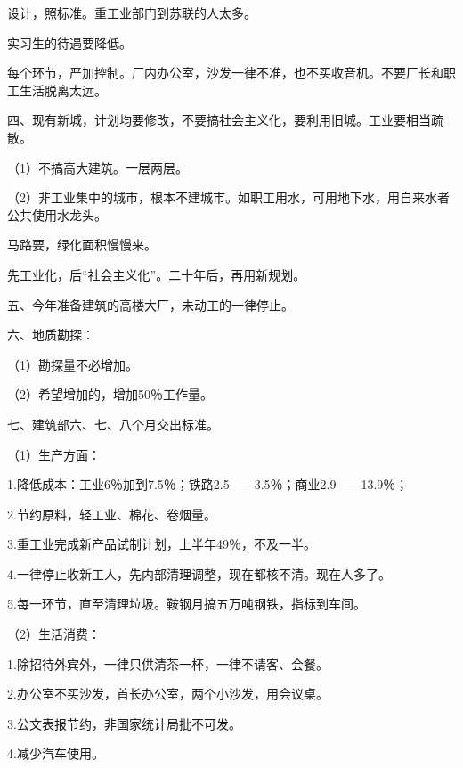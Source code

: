 设计，照标准。重工业部门到苏联的人太多。

实习生的待遇要降低。

每个环节，严加控制。厂内办公室，沙发一律不准，也不买收音机。不要厂长和职工生活脱离太远。

四、现有新城，计划均要修改，不要搞社会主义化，要利用旧城。工业要相当疏散。

（1）不搞高大建筑。一层两层。

（2）非工业集中的城市，根本不建城市。如职工用水，可用地下水，用自来水者公共使用水龙头。

马路要，绿化面积慢慢来。

先工业化，后“社会主义化”。二十年后，再用新规划。

五、今年准备建筑的高楼大厂，未动工的一律停止。

六、地质勘探：

（1）勘探量不必增加。

（2）希望增加的，增加50％工作量。

七、建筑部六、七、八个月交出标准。

（1）生产方面：

1.降低成本：工业6％加到7.5％；铁路2.5——3.5％；商业2.9——13.9％；

2.节约原料，轻工业、棉花、卷烟量。

3.重工业完成新产品试制计划，上半年49％，不及一半。

4.一律停止收新工人，先内部清理调整，现在都核不清。现在人多了。

5.每一环节，直至清理垃圾。鞍钢月搞五万吨钢铁，指标到车间。

（2）生活消费：

1.除招待外宾外，一律只供清茶一杯，一律不请客、会餐。

2.办公室不买沙发，首长办公室，两个小沙发，用会议桌。

3.公文表报节约，非国家统计局批不可发。

4.减少汽车使用。


